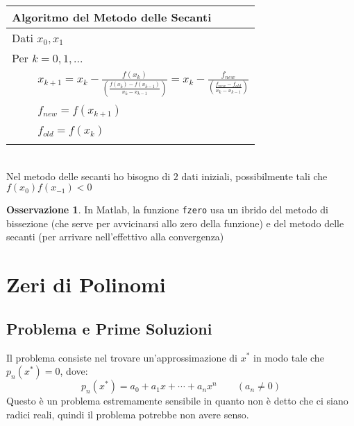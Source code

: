 \documentclass[11pt,a4paper,twoside]{article}
\theoremstyle{definition}
\newtheorem*{oss}{Osservazione}
\begin{document}
\begin{itemize}
		\begin{tabular}{l}
		\\
		\textbf{Algoritmo del Metodo delle Secanti}\\
		\hline
		Dati $x_0, x_1$\\
		Per $k= 0,1,...$\\
		$\qquad$ $x_{k+1} = x_k - \frac{f(x_k)}{\left( \frac{f(x_k) - f(x_{k-1})}{x_k-x_{k-1}} \right)} = x_k - \frac{f_{new}}{\left( \frac{f_{new} - f_{old}}{x_k - x_{k-1}} \right)} $\\
		$\qquad$ $f_{new} = f(x_{k+1})$\\
		$\qquad$ $f_{old} = f(x_k)$\\
		\\
		\end{tabular}\\
		Nel metodo delle secanti ho bisogno di $2$ dati iniziali, possibilmente tali che $f(x_0)f(x_{-1})<0$
\end{itemize}

\begin{oss}
	In Matlab, la funzione \texttt{fzero} usa un ibrido del metodo di bissezione (che serve per avvicinarsi allo zero della funzione) e del metodo delle secanti (per arrivare nell'effettivo alla convergenza)
\end{oss}

\newpage

\section{Zeri di Polinomi}

\subsection{Problema e Prime Soluzioni}

Il problema consiste nel trovare un'approssimazione di $x^*$ in modo tale che $p_n(x^*) =0$, dove:
\[ p_n(x^*) =  a_0 + a_1x + \cdots + a_nx^n \qquad (a_n \neq 0)\]
Questo è un problema estremamente sensibile in quanto non è detto che ci siano radici reali, quindi il problema potrebbe non avere senso.
\end{document}

